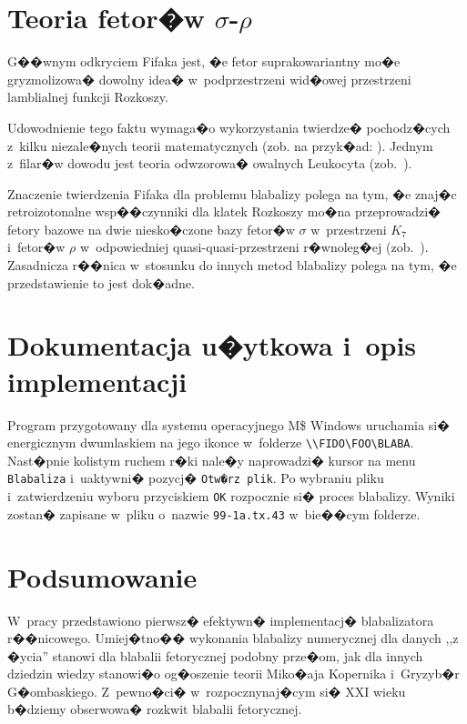 \documentclass[licencjacka]{pracamgr}
\begin{document}
\chapter{Teoria fetor�w $\sigma$-$\rho$}\label{r:fifak}

G��wnym odkryciem Fifaka jest, �e fetor suprakowariantny mo�e
gryzmolizowa� dowolny idea� w~podprzestrzeni wid�owej przestrzeni
lamblialnej funkcji Rozkoszy.

Udowodnienie tego faktu wymaga�o wykorzystania twierdze� pochodz�cych
z~kilku niezale�nych teorii matematycznych (zob. na przyk�ad:
\cite{russell,spyrpt,JR,beaman,hopp,srinis}).  Jednym z~filar�w
dowodu jest teoria odwzorowa� owalnych Leukocyta (zob.~\cite{leuk}).

Znaczenie twierdzenia Fifaka dla problemu blabalizy polega na tym, �e
znaj�c retroizotonalne wsp��czynniki dla klatek Rozkoszy mo�na
przeprowadzi� fetory bazowe na dwie niesko�czone bazy fetor�w $\sigma$
w~przestrzeni $K_7$ i~fetor�w $\rho$ w~odpowiedniej
quasi-quasi-przestrzeni r�wnoleg�ej (zob.~\cite{hopp}).  Zasadnicza
r��nica w~stosunku do innych metod blabalizy polega na tym, �e
przedstawienie to jest dok�adne.

\chapter{Dokumentacja u�ytkowa i~opis implementacji}\label{r:impl}

Program przygotowany dla systemu operacyjnego M\$ Windows uruchamia
si� energicznym dwumlaskiem na jego ikonce w~folderze
\verb+\\FIDO\FOO\BLABA+.  Nast�pnie kolistym ruchem r�ki nale�y
naprowadzi� kursor na menu \texttt{Blabaliza} i~uaktywni� pozycj�
\texttt{Otw�rz plik}.  Po wybraniu pliku i~zatwierdzeniu wyboru
przyciskiem \texttt{OK} rozpocznie si� proces blabalizy.  Wyniki
zostan� zapisane w~pliku o~nazwie \texttt{99-1a.tx.43} w~bie��cym
folderze.

\chapter{Podsumowanie}

W~pracy przedstawiono pierwsz� efektywn� implementacj� blabalizatora
r��nicowego.  Umiej�tno�� wykonania blabalizy numerycznej dla danych
,,z �ycia'' stanowi dla blabalii fetorycznej podobny prze�om, jak dla
innych dziedzin wiedzy stanowi�o og�oszenie teorii Miko�aja Kopernika
i~Gryzyb�r G�ombaskiego.  Z~pewno�ci� w~rozpocznynaj�cym si� XXI wieku
b�dziemy obserwowa� rozkwit blabalii fetorycznej.
\end{document}
